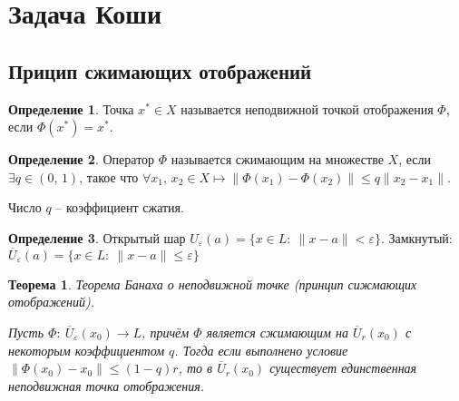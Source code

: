\documentclass[a4paper,12pt]{article}
\renewcommand{\leq}{\ensuremath{\leqslant}}
\theoremstyle{plain}
\newtheorem{theorem}{Теорема}[section]
\theoremstyle{definition}
\newtheorem{definition}{Определение}[section]
\theoremstyle{remark}
\begin{document}
\section{Задача Коши}
\subsection{Прицип сжимающих отображений}
\begin{definition}
	Точка $x^* \in X$ называется неподвижной точкой отображения $\Phi$, если $\Phi(x^*) = x^*$.
\end{definition}

\begin{definition}
	Оператор $\Phi$ называется сжимающим на множестве $X$, если $\exists q \in (0,\,1)$, такое что $\forall x_1,\,x_2 \in X \mapsto \|\Phi(x_1) - \Phi(x_2)\| \leq q \|x_2 - x_1\|$.

	Число $q$ -- коэффициент сжатия.
\end{definition}

\begin{definition}
	Открытый шар $U_\varepsilon(a) = \{x \in L :\: \|x - a\| < \varepsilon\}$. Замкнутый: $\overline{U}_\varepsilon(a) = \{x \in L:\: \|x-a\|\leq\varepsilon\}$
\end{definition}

\begin{theorem}
	Теорема Банаха о неподвижной точке (принцип сижмающих отображений).

	Пусть $\Phi:\: \overline{U}_\varepsilon(x_0) \to L$, причём $\Phi$ является сжимающим на $\overline{U}_r(x_0)$ с некоторым коэффициентом $q$. Тогда если выполнено условие $\|\Phi(x_0) - x_0\| \leq (1 - q)r$, то в $\overline{U}_r(x_0)$ существует единственная неподвижная точка отображения.
\end{theorem}
\end{document}
